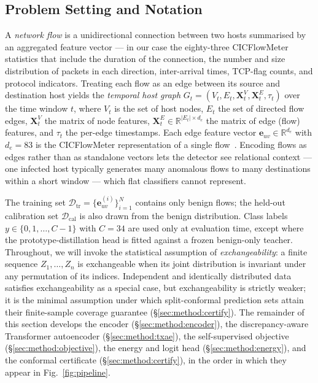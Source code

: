 \documentclass{ieeeaccess}
\begin{document}
\subsection{Problem Setting and Notation}
\label{sec:method:setting}
A \emph{network flow} is a unidirectional connection between two hosts
summarised by an aggregated feature vector --- in our case the
eighty-three CICFlowMeter statistics that include the duration of the
connection, the number and size distribution of packets in each direction,
inter-arrival times, TCP-flag counts, and protocol indicators. Treating
each flow as an edge between its source and destination host yields the
\emph{temporal host graph}
$G_t = (V_t, E_t, \mathbf{X}_t^V, \mathbf{X}_t^E, \tau_t)$ over the time
window $t$, where $V_t$ is the set of host nodes, $E_t$ the set of
directed flow edges, $\mathbf{X}_t^V$ the matrix of node features,
$\mathbf{X}_t^E \in \mathbb{R}^{|E_t|\times d_e}$ the matrix of edge
(flow) features, and $\tau_t$ the per-edge timestamps. Each edge feature
vector $\mathbf{e}_{uv} \in \mathbb{R}^{d_e}$ with $d_e = 83$ is the
CICFlowMeter representation of a single flow~\cite{sharafaldin2018cicids}.
Encoding flows as edges rather than as standalone vectors lets the
detector see relational context --- one infected host typically generates
many anomalous flows to many destinations within a short window --- which
flat classifiers cannot represent.

The training set
$\mathcal{D}_\text{tr} = \{\mathbf{e}_{uv}^{(i)}\}_{i=1}^N$ contains only
benign flows; the held-out calibration set $\mathcal{D}_\text{cal}$ is
also drawn from the benign distribution. Class labels
$y \in \{0, 1, \dots, C-1\}$ with $C = 34$ are used only at evaluation
time, except where the prototype-distillation head is fitted against a
frozen benign-only teacher. Throughout, we will invoke the
statistical assumption of \emph{exchangeability}: a finite sequence
$Z_1, \dots, Z_n$ is exchangeable when its joint distribution is invariant
under any permutation of its indices. Independent and identically
distributed data satisfies exchangeability as a special case, but
exchangeability is strictly weaker; it is the minimal assumption under
which split-conformal prediction sets attain their finite-sample coverage
guarantee (\S\ref{sec:method:certify}). The remainder of this section
develops the encoder (\S\ref{sec:method:encoder}), the discrepancy-aware
Transformer autoencoder (\S\ref{sec:method:txae}), the self-supervised
objective (\S\ref{sec:method:objective}), the energy and logit head
(\S\ref{sec:method:energy}), and the conformal certificate
(\S\ref{sec:method:certify}), in the order in which they appear in
Fig.~\ref{fig:pipeline}.
\end{document}
